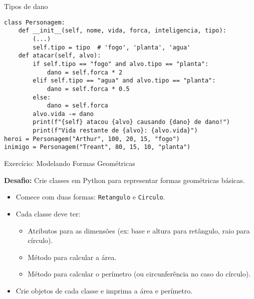 \begin{frame}[fragile]{Tipos de dano}


\begin{verbatim}
class Personagem:
    def __init__(self, nome, vida, forca, inteligencia, tipo):
        (...)
        self.tipo = tipo  # 'fogo', 'planta', 'agua'
    def atacar(self, alvo):
        if self.tipo == "fogo" and alvo.tipo == "planta":
            dano = self.forca * 2
        elif self.tipo == "agua" and alvo.tipo == "planta":
            dano = self.forca * 0.5
        else:
            dano = self.forca
        alvo.vida -= dano
        print(f"{self} atacou {alvo} causando {dano} de dano!")
        print(f"Vida restante de {alvo}: {alvo.vida}")
heroi = Personagem("Arthur", 100, 20, 15, "fogo")
inimigo = Personagem("Treant", 80, 15, 10, "planta")
\end{verbatim}



\end{frame}
 \begin{frame}{Exercício: Modelando Formas Geométricas}

\textbf{Desafio:} Crie classes em Python para representar formas geométricas básicas.

\begin{itemize}
\item Comece com duas formas: \texttt{Retangulo} e \texttt{Circulo}.
\item Cada classe deve ter:
\begin{itemize}
\item Atributos para as dimensões (ex: base e altura para retângulo, raio para círculo).
\item Método para calcular a área.
\item Método para calcular o perímetro (ou circunferência no caso do círculo).
\end{itemize}
\item Crie objetos de cada classe e imprima a área e perímetro.
\end{itemize}


\end{frame}

